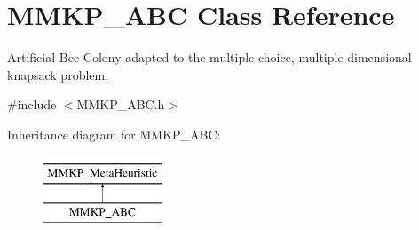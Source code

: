 \hypertarget{class_m_m_k_p___a_b_c}{\section{M\+M\+K\+P\+\_\+\+A\+B\+C Class Reference}
\label{class_m_m_k_p___a_b_c}
}


Artificial Bee Colony adapted to the multiple-\/choice, multiple-\/dimensional knapsack problem.  




{\ttfamily \#include $<$M\+M\+K\+P\+\_\+\+A\+B\+C.\+h$>$}

Inheritance diagram for M\+M\+K\+P\+\_\+\+A\+B\+C\+:\begin{figure}[H]
\begin{center}
\leavevmode
\includegraphics[height=2.000000cm]{class_m_m_k_p___a_b_c}
\end{center}
\end{figure}
